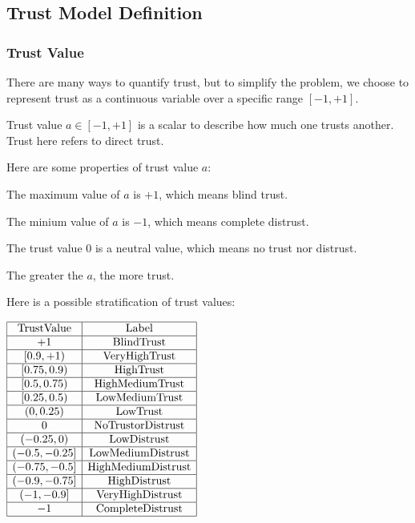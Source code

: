 \documentclass{article}
\begin{document}
\subsection{Trust Model Definition}


\subsubsection{Trust Value}

There are many ways to quantify trust, but to simplify the problem, we choose to represent trust as a continuous variable over a specific range \([-1,+1]\).

Trust value \(a\in [-1,+1]\) is a scalar to describe how much one trusts another. Trust here refers to direct trust.

Here are some properties of trust value \(a\):

The maximum value of \(a\) is \(+1\), which means blind trust.

The minium value of \(a\) is \(-1\), which means complete distrust.

The trust value \(0\) is a neutral value, which means no trust nor distrust.

The greater the \(a\), the more trust.

Here is a possible stratification of trust values:

\(\begin{array}{|c|c|}
\hline
 \text{Trust} \text{Value} & \text{Label} \\
\hline
 +1 & \text{Blind} \text{Trust} \\
\hline
 [0.9,+1) & \text{Very} \text{High} \text{Trust} \\
\hline
 [0.75,0.9) & \text{High} \text{Trust} \\
\hline
 [0.5,0.75) & \text{High} \text{Medium} \text{Trust} \\
\hline
 [0.25,0.5) & \text{Low} \text{Medium} \text{Trust} \\
\hline
 (0,0.25) & \text{Low} \text{Trust} \\
\hline
 0 & \text{No} \text{Trust} \text{or} \text{Distrust} \\
\hline
 (-0.25,0) & \text{Low} \text{Distrust} \\
\hline
 (-0.5,-0.25] & \text{Low} \text{Medium} \text{Distrust} \\
\hline
 (-0.75,-0.5] & \text{High} \text{Medium} \text{Distrust} \\
\hline
 (-0.9,-0.75] & \text{High} \text{Distrust} \\
\hline
 (-1,-0.9] & \text{Very} \text{High} \text{Distrust} \\
\hline
 -1 & \text{Complete} \text{Distrust} \\
\hline
\end{array}\)
\end{document}
